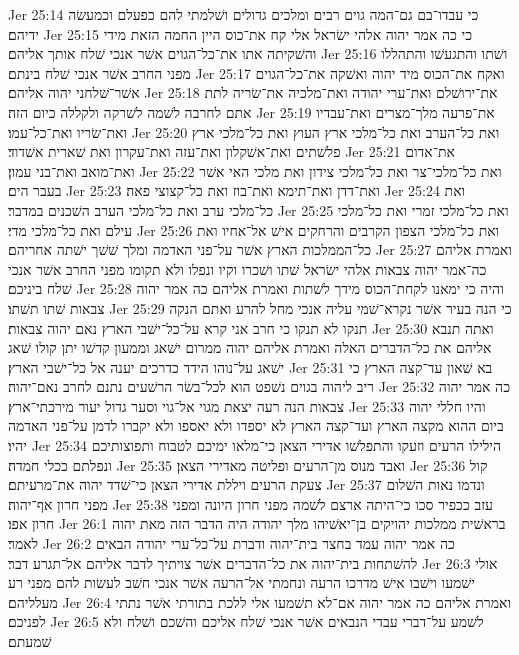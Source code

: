 Jer 25:14  כי עבדו־בם גם־המה גוים רבים ומלכים גדולים ושׁלמתי להם כפעלם וכמעשׂה ידיהם׃
Jer 25:15  כי כה אמר יהוה אלהי ישׂראל אלי קח את־כוס היין החמה הזאת מידי והשׁקיתה אתו את־כל־הגוים אשׁר אנכי שׁלח אותך אליהם׃
Jer 25:16  ושׁתו והתגעשׁו והתהללו מפני החרב אשׁר אנכי שׁלח בינתם׃
Jer 25:17  ואקח את־הכוס מיד יהוה ואשׁקה את־כל־הגוים אשׁר־שׁלחני יהוה אליהם׃
Jer 25:18  את־ירושׁלם ואת־ערי יהודה ואת־מלכיה את־שׂריה לתת אתם לחרבה לשׁמה לשׁרקה ולקללה כיום הזה׃
Jer 25:19  את־פרעה מלך־מצרים ואת־עבדיו ואת־שׂריו ואת־כל־עמו׃
Jer 25:20  ואת כל־הערב ואת כל־מלכי ארץ העוץ ואת כל־מלכי ארץ פלשׁתים ואת־אשׁקלון ואת־עזה ואת־עקרון ואת שׁארית אשׁדוד׃
Jer 25:21  את־אדום ואת־מואב ואת־בני עמון׃
Jer 25:22  ואת כל־מלכי־צר ואת כל־מלכי צידון ואת מלכי האי אשׁר בעבר הים׃
Jer 25:23  ואת־דדן ואת־תימא ואת־בוז ואת כל־קצוצי פאה׃
Jer 25:24  ואת כל־מלכי ערב ואת כל־מלכי הערב השׁכנים במדבר׃
Jer 25:25  ואת כל־מלכי זמרי ואת כל־מלכי עילם ואת כל־מלכי מדי׃
Jer 25:26  ואת כל־מלכי הצפון הקרבים והרחקים אישׁ אל־אחיו ואת כל־הממלכות הארץ אשׁר על־פני האדמה ומלך שׁשׁך ישׁתה אחריהם׃
Jer 25:27  ואמרת אליהם כה־אמר יהוה צבאות אלהי ישׂראל שׁתו ושׁכרו וקיו ונפלו ולא תקומו מפני החרב אשׁר אנכי שׁלח ביניכם׃
Jer 25:28  והיה כי ימאנו לקחת־הכוס מידך לשׁתות ואמרת אליהם כה אמר יהוה צבאות שׁתו תשׁתו׃
Jer 25:29  כי הנה בעיר אשׁר נקרא־שׁמי עליה אנכי מחל להרע ואתם הנקה תנקו לא תנקו כי חרב אני קרא על־כל־ישׁבי הארץ נאם יהוה צבאות׃
Jer 25:30  ואתה תנבא אליהם את כל־הדברים האלה ואמרת אליהם יהוה ממרום ישׁאג וממעון קדשׁו יתן קולו שׁאג ישׁאג על־נוהו הידד כדרכים יענה אל כל־ישׁבי הארץ׃
Jer 25:31  בא שׁאון עד־קצה הארץ כי ריב ליהוה בגוים נשׁפט הוא לכל־בשׂר הרשׁעים נתנם לחרב נאם־יהוה׃
Jer 25:32  כה אמר יהוה צבאות הנה רעה יצאת מגוי אל־גוי וסער גדול יעור מירכתי־ארץ׃
Jer 25:33  והיו חללי יהוה ביום ההוא מקצה הארץ ועד־קצה הארץ לא יספדו ולא יאספו ולא יקברו לדמן על־פני האדמה יהיו׃
Jer 25:34  הילילו הרעים וזעקו והתפלשׁו אדירי הצאן כי־מלאו ימיכם לטבוח ותפוצותיכם ונפלתם ככלי חמדה׃
Jer 25:35  ואבד מנוס מן־הרעים ופליטה מאדירי הצאן׃
Jer 25:36  קול צעקת הרעים ויללת אדירי הצאן כי־שׁדד יהוה את־מרעיתם׃
Jer 25:37  ונדמו נאות השׁלום מפני חרון אף־יהוה׃
Jer 25:38  עזב ככפיר סכו כי־היתה ארצם לשׁמה מפני חרון היונה ומפני חרון אפו׃
Jer 26:1  בראשׁית ממלכות יהויקים בן־יאשׁיהו מלך יהודה היה הדבר הזה מאת יהוה לאמר׃
Jer 26:2  כה אמר יהוה עמד בחצר בית־יהוה ודברת על־כל־ערי יהודה הבאים להשׁתחות בית־יהוה את כל־הדברים אשׁר צויתיך לדבר אליהם אל־תגרע דבר׃
Jer 26:3  אולי ישׁמעו וישׁבו אישׁ מדרכו הרעה ונחמתי אל־הרעה אשׁר אנכי חשׁב לעשׂות להם מפני רע מעלליהם׃
Jer 26:4  ואמרת אליהם כה אמר יהוה אם־לא תשׁמעו אלי ללכת בתורתי אשׁר נתתי לפניכם׃
Jer 26:5  לשׁמע על־דברי עבדי הנבאים אשׁר אנכי שׁלח אליכם והשׁכם ושׁלח ולא שׁמעתם׃
